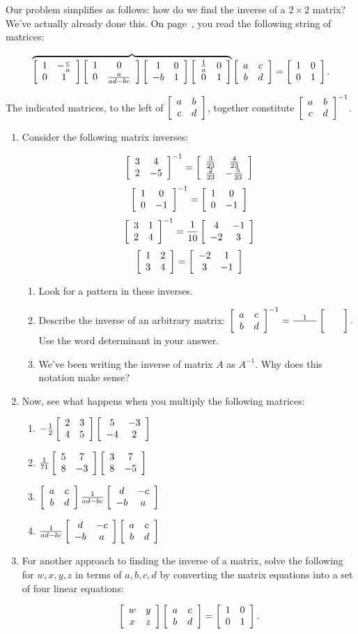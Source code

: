 \documentclass[../gatm.tex]{subfiles}
\begin{document}
Our problem simplifies as follows: how do we find the inverse of a $2\times 2$ matrix? We've actually already done this. On page~\pageref{prob:list_of_matrices}, you read the following string of matrices:

$$\overbrace{\twomat{1}{-\frac{c}{a}}{0}{1}\twomat{1}{0}{0}{\frac{a}{ad-bc}}\twomat{1}{0}{-b}{1}\twomat{\frac{1}{a}}{0}{0}{1}}\twomat{a}{c}{b}{d}=\twomat{1}{0}{0}{1}.$$

The indicated matrices, to the left of $\twomat{a}{b}{c}{d}$, together constitute $\twomat{a}{b}{c}{d}^{-1}$.

\begin{enumerate}
\setcounter{enumi}{\value{problem_i}}
\item Consider the following matrix inverses:

$$\twomat{3}{4}{2}{-5}^{-1}=\twomat{\frac{3}{23}}{\frac{4}{23}}{\frac{2}{23}}{-\frac{5}{23}}$$
$$\twomat{1}{0}{0}{-1}^{-1}=\twomat{1}{0}{0}{-1}$$
$$\twomat{3}{1}{2}{4}^{-1}=\frac{1}{10}\twomat{4}{-1}{-2}{3}$$
$$\twomat{1}{2}{3}{4} = \twomat{-2}{1}{3}{-1}$$

\begin{enumerate}
\item Look for a pattern in these inverses.
\item Describe the inverse of an arbitrary matrix: $\twomat{a}{c}{b}{d}^{-1}=\frac{1}{\phantom{000000}}\twomat{}{}{}{}.$ Use the word determinant in your answer.
\item We've been writing the inverse of matrix $A$ as $A^{-1}$. Why does this notation make sense?
\end{enumerate}
\item Now, see what happens when you multiply the following matrices:
\begin{multicols}{2}
\begin{enumerate}
\item $-\frac{1}{2}\twomat{2}{3}{4}{5}\twomat{5}{-3}{-4}{2}$
\item $\frac{1}{71}\twomat{5}{7}{8}{-3}\twomat{3}{7}{8}{-5}$
\item $\twomat{a}{c}{b}{d}\frac{1}{ad-bc}\twomat{d}{-c}{-b}{a}$
\item $\frac{1}{ad-bc}\twomat{d}{-c}{-b}{a}\twomat{a}{c}{b}{d}$
\end{enumerate}
\end{multicols}
\item For another approach to finding the inverse of a matrix, solve the following for $w,x,y,z$ in terms of $a,b,c,d$ by converting the matrix equations into a set of four linear equations:

$$\twomat{w}{y}{x}{z}\twomat{a}{c}{b}{d}=\twomat{1}{0}{0}{1}.$$
\setcounter{problem_i}{\value{enumi}}
\end{enumerate}
\end{document}
